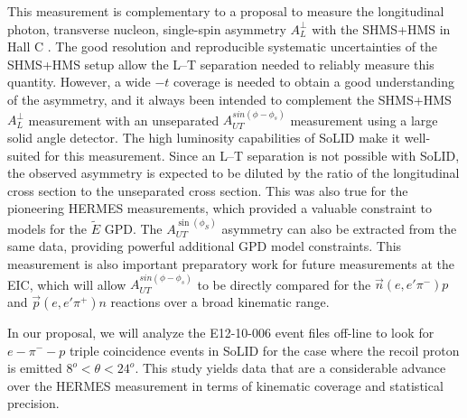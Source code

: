 \documentclass{article}
\begin{document}
This measurement is complementary to a proposal to measure the longitudinal
photon, transverse nucleon, single-spin asymmetry $A_L^{\perp}$ with the
SHMS+HMS in Hall C \cite{atpi39}.  The good resolution and reproducible
systematic uncertainties of the SHMS+HMS setup allow the L--T separation needed
to reliably measure this quantity.  However, a wide $-t$ coverage is needed to
obtain a good understanding of the asymmetry, and it always been intended to
complement the SHMS+HMS $A_L^{\perp}$ measurement with an unseparated
$A_{UT}^{sin(\phi-\phi_s)}$ measurement using a large solid angle detector.
The high luminosity capabilities of SoLID make it well-suited for this
measurement.  Since an L--T separation is not possible with SoLID, the observed
asymmetry is expected to be diluted by the ratio of the longitudinal cross
section to the unseparated cross section.  This was also true for the
pioneering HERMES measurements, which provided a valuable constraint to models
for the $\tilde{E}$ GPD.  The $A_{UT}^{\sin(\phi_S)}$ asymmetry can also be
extracted from the same data, providing powerful additional GPD model
constraints.  This measurement is also important preparatory work for future
measurements at the EIC, which will allow $A_{UT}^{sin(\phi-\phi_s)}$ to be
directly compared for the $\vec{n}(e,e'\pi^-)p$ and $\vec{p}(e,e'\pi^+)n$
reactions over a broad kinematic range.


In our proposal, we will analyze the E12-10-006 event files
off-line to look for $e-\pi^--p$ triple coincidence events in SoLID for the
case where the recoil proton is emitted $8^o<\theta<24^o$.  This study yields
data that are a considerable advance over the HERMES measurement in terms of
kinematic coverage and statistical precision. 


\newpage
\appendix
%
%

\end{document}
